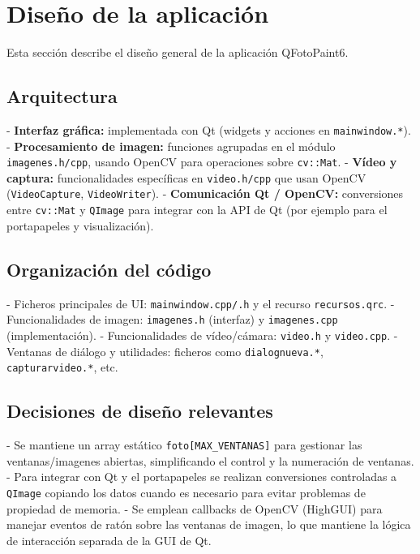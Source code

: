 \section{Diseño de la aplicación}

Esta sección describe el diseño general de la aplicación QFotoPaint6.

\subsection{Arquitectura}

- \textbf{Interfaz gráfica:} implementada con Qt (widgets y acciones en \texttt{mainwindow.*}).
- \textbf{Procesamiento de imagen:} funciones agrupadas en el módulo \texttt{imagenes.h/cpp}, usando OpenCV para operaciones sobre \texttt{cv::Mat}.
- \textbf{Vídeo y captura:} funcionalidades específicas en \texttt{video.h/cpp} que usan OpenCV (\texttt{VideoCapture}, \texttt{VideoWriter}).
- \textbf{Comunicación Qt / OpenCV:} conversiones entre \texttt{cv::Mat} y \texttt{QImage} para integrar con la API de Qt (por ejemplo para el portapapeles y visualización).

\subsection{Organización del código}

- Ficheros principales de UI: \texttt{mainwindow.cpp/.h} y el recurso \texttt{recursos.qrc}.
- Funcionalidades de imagen: \texttt{imagenes.h} (interfaz) y \texttt{imagenes.cpp} (implementación).
- Funcionalidades de vídeo/cámara: \texttt{video.h} y \texttt{video.cpp}.
- Ventanas de diálogo y utilidades: ficheros como \texttt{dialognueva.*}, \texttt{capturarvideo.*}, etc.

\subsection{Decisiones de diseño relevantes}

- Se mantiene un array estático \texttt{foto[MAX\_VENTANAS]} para gestionar las ventanas/imagenes abiertas, simplificando el control y la numeración de ventanas.
- Para integrar con Qt y el portapapeles se realizan conversiones controladas a \texttt{QImage} copiando los datos cuando es necesario para evitar problemas de propiedad de memoria.
- Se emplean callbacks de OpenCV (HighGUI) para manejar eventos de ratón sobre las ventanas de imagen, lo que mantiene la lógica de interacción separada de la GUI de Qt.
